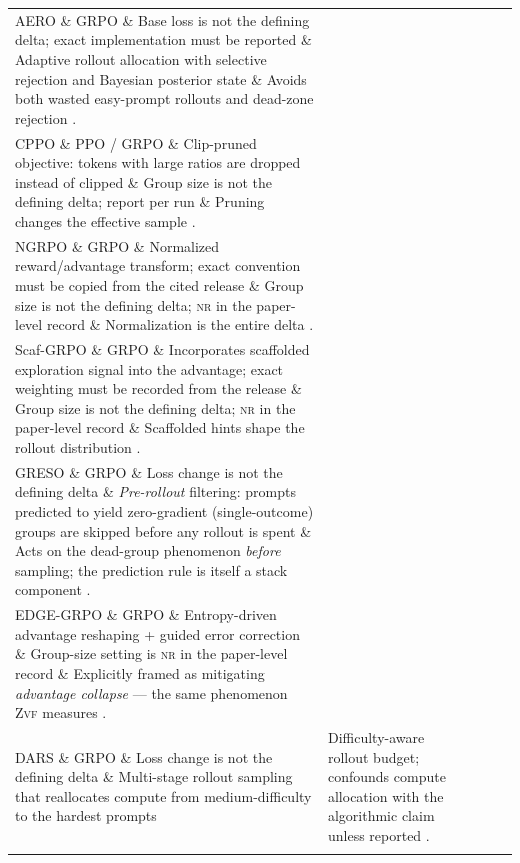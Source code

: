 \documentclass[11pt]{article}
\newcommand{\nr}{\textsc{nr}}
\newcommand{\zvf}{\textsc{Zvf}}
\newcommand{\grpo}{\textsc{GRPO}}
\begin{document}
\begin{longtable}{@{}p{2.1cm}p{2.4cm}p{3.0cm}p{2.0cm}p{3.3cm}@{}}
AERO \& \grpo{} \& Base loss is not the defining delta; exact implementation
  must be reported \& Adaptive rollout allocation with selective rejection and
  Bayesian posterior state \& Avoids both wasted easy-prompt rollouts and
  dead-zone rejection \cite{zhang2026aero}.\\
\addlinespace

CPPO \& PPO / \grpo{} \& Clip-pruned objective: tokens with large ratios are
  dropped instead of clipped \& Group size is not the defining delta; report per
  run \& Pruning changes the
  effective sample \cite{lin2025cppo}.\\
\addlinespace

NGRPO \& \grpo{} \& Normalized reward/advantage transform; exact convention must
  be copied from the cited release \& Group size is not the defining delta; \nr{}
  in the paper-level record \& Normalization is the entire delta
  \cite{nan2025ngrpo}.\\
\addlinespace

Scaf-\grpo{} \& \grpo{} \& Incorporates scaffolded exploration signal into the
  advantage; exact weighting must be recorded from the release \& Group size is
  not the defining delta; \nr{} in the paper-level record \& Scaffolded hints shape
  the rollout distribution \cite{zhang2025scaffgrpo}.\\
\addlinespace

GRESO \& \grpo{} \& Loss change is not the defining delta \& \emph{Pre-rollout} filtering:
  prompts predicted to yield zero-gradient (single-outcome) groups are skipped
  before any rollout is spent \& Acts on the dead-group phenomenon \emph{before}
  sampling; the prediction rule is itself a stack component
  \cite{greso2025,agenticrlsurvey2026}.\\
\addlinespace

EDGE-\grpo{} \& \grpo{} \& Entropy-driven advantage reshaping + guided error
  correction \& Group-size setting is \nr{} in the paper-level record \& Explicitly framed as mitigating
  \emph{advantage collapse} --- the same phenomenon \zvf{} measures
  \cite{edgegrpo2025,agenticrlsurvey2026}.\\
\addlinespace

DARS \& \grpo{} \& Loss change is not the defining delta \& Multi-stage rollout sampling that
  reallocates compute from medium-difficulty to the hardest prompts &
  Difficulty-aware rollout budget; confounds compute allocation with the
  algorithmic claim unless reported \cite{dars2025,agenticrlsurvey2026}.\\
\addlinespace


\end{longtable}
\end{document}
